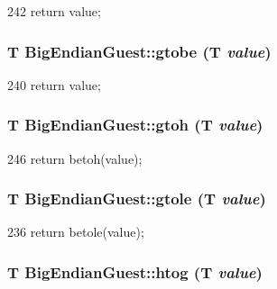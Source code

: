 \begin{DoxyCode}
242 {return value;}
\end{DoxyCode}
\hypertarget{namespaceBigEndianGuest_ad77d11499d6bfb2b207b17cb7319f5ec}{
\subsubsection[{gtobe}]{\setlength{\rightskip}{0pt plus 5cm}T BigEndianGuest::gtobe (T {\em value})}}
\label{namespaceBigEndianGuest_ad77d11499d6bfb2b207b17cb7319f5ec}



\begin{DoxyCode}
240 {return value;}
\end{DoxyCode}
\hypertarget{namespaceBigEndianGuest_adb51b41dd17278558edf419359f52de6}{
\subsubsection[{gtoh}]{\setlength{\rightskip}{0pt plus 5cm}T BigEndianGuest::gtoh (T {\em value})}}
\label{namespaceBigEndianGuest_adb51b41dd17278558edf419359f52de6}



\begin{DoxyCode}
246 {return betoh(value);}
\end{DoxyCode}
\hypertarget{namespaceBigEndianGuest_aeab167e8a814d73ceb79ff46de96ba0d}{
\subsubsection[{gtole}]{\setlength{\rightskip}{0pt plus 5cm}T BigEndianGuest::gtole (T {\em value})}}
\label{namespaceBigEndianGuest_aeab167e8a814d73ceb79ff46de96ba0d}



\begin{DoxyCode}
236 {return betole(value);}
\end{DoxyCode}
\hypertarget{namespaceBigEndianGuest_a10c3370b6af5a1216a2a64c0d379f788}{
\subsubsection[{htog}]{\setlength{\rightskip}{0pt plus 5cm}T BigEndianGuest::htog (T {\em value})}}
\label{namespaceBigEndianGuest_a10c3370b6af5a1216a2a64c0d379f788}



